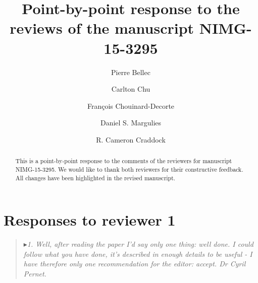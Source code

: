\documentclass[authoryear,3p]{elsarticle}
\begin{document}
\begin{frontmatter}
\title{Point-by-point response to the reviews of the manuscript NIMG-15-3295}


\author[label0,label1,label2]{Pierre Bellec}
\address[label0]{The Neuro Bureau}
\address[label1]{Centre de Recherche de l'Institut Universitaire de G\'eriatrie de Montr\'eal, Montr\'eal, CA}
\address[label2]{D\'epartement d'Informatique et de Recherche Op\'erationnelle, Universit\'e de Montr\'eal, Montr\'eal, CA}



\author[label0,label3]{Carlton Chu}
\address[label3]{Google DeepMind, London, UK}

\author[label0,label1,label4]{Fran\c{c}ois Chouinard-Decorte}
\address[label4]{Integrated Program in Neuroscience, McGill University, Montreal, CA}

\author[label0,label5]{Daniel S. Margulies}
\address[label5]{Max Planck Research Group for Neuroanatomy \& Connectivity, Max Planck Institute for Human Cognitive and Brain Sciences, Leipzig, Germany}

\author[label0,lab6,lab7]{R. Cameron Craddock}
\address[lab6]{Computational Neuroimaging Laboratory, Center for Biomedical Imaging and Neuromodulation, Nathan S. Kline Institute for Psychiatric Research, Orangeburg, NY, USA}
\address[lab7]{Center for the Developing Brain, Child Mind Institute, New York, NY, USA}

\begin{abstract} This is a point-by-point response to the comments of the reviewers for manuscript NIMG-15-3295. We would like to thank both reviewers for their constructive feedback. All changes have been highlighted in the revised manuscript. 
\end{abstract}

\end{frontmatter}


\section{Responses to reviewer 1}


\begin{quote}
$\blacktriangleright$\emph{1. Well, after reading the paper I'd say only one thing: well done. I could follow what you have done, it's described in enough details to be useful - I have therefore only one recommendation for the editor: accept.
Dr Cyril Pernet. }
\end{quote}
\end{document}
